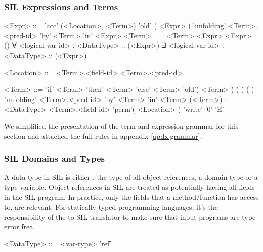 \subsubsection{SIL Expressions and Terms}
\begin{grammar}
<Expr> ::= 'acc' (<Location>, <Term>)
	\alt 'old' ( <Expr> )
	\alt 'unfolding' <Term>.<pred-id> 'by' <Term> 'in' <Expr>
	\alt <Term> == <Term>
	\alt <unary-op> <Expr>
	\alt <binary-op> <Expr>
	\alt <dom-pred-id>()
	\alt ∀ <logical-var-id> : <DataType> :: (<Expr>)
	\alt ∃ <logical-var-id> : <DataType> :: (<Expr>)

<Location> ::= <Term>.<field-id>
	\alt <Term>.<pred-id>
\end{grammar}

\begin{grammar}
<Term> ::= 'if' <Term> 'then' <Term> 'else' <Term>
	\alt <var-id>
	\alt <logical-var-id>
	\alt 'old'( <Term> )
	\alt <func-id>(  )
	\alt <dom-func-id>(  )
	\alt 'unfolding' <Term>.<pred-id> 'by' <Term> 'in' <Term>
	\alt (<Term>) : <DataType>
	\alt <Term>.<field-id>
	\alt 'perm'( <Location> )
	\alt 'write'
	\alt '0'
	\alt  'E'
	\alt <integer-literal>
\end{grammar}

We simplified the presentation of the term and expression grammar for this section and attached the full rules in appendix \ref{apdx:grammar}.

\subsubsection{SIL Domains and Types}
A data type in SIL is either , the type of all object references, a domain type or a type variable.
Object references in SIL are treated as potentially having all fields in the SIL program. In practice, only the fields that a method/function has access to, are relevant.
For statically typed programming languages, it's the responsibility of the to-SIL-translator to make sure that input programs are type error free.
\begin{grammar}
<DataType> 
	::=  <var-type>
	\alt <dom-type>
	\alt 'ref'
\end{grammar}

